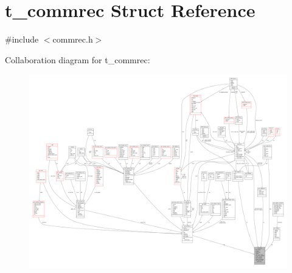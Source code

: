\hypertarget{structt__commrec}{\section{t\-\_\-commrec \-Struct \-Reference}
\label{structt__commrec}
}


{\ttfamily \#include $<$commrec.\-h$>$}



\-Collaboration diagram for t\-\_\-commrec\-:
\nopagebreak
\begin{figure}[H]
\begin{center}
\leavevmode
\includegraphics[width=350pt]{structt__commrec__coll__graph}
\end{center}
\end{figure}
